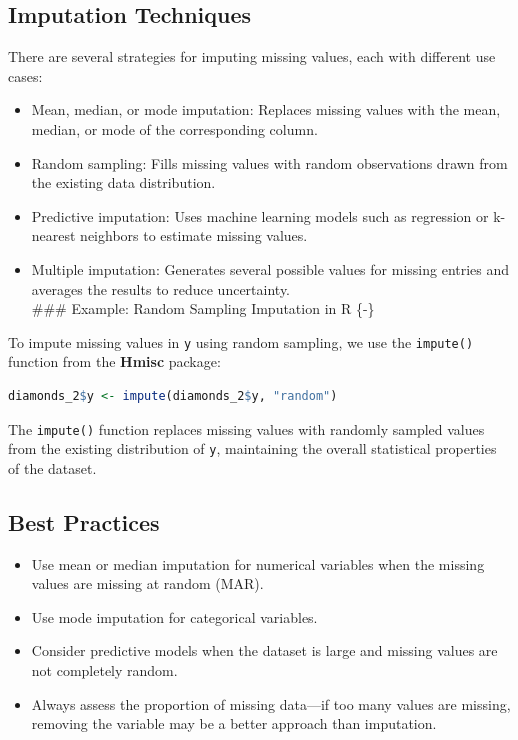 \documentclass[
]{book}
\newcommand{\passthrough}[1]{#1}
\providecommand{\tightlist}{%
  \setlength{\itemsep}{0pt}\setlength{\parskip}{0pt}}
\theoremstyle{definition}
\theoremstyle{definition}
\theoremstyle{definition}
\theoremstyle{definition}
\theoremstyle{remark}
\begin{document}
\subsection*{Imputation Techniques}\label{imputation-techniques}

There are several strategies for imputing missing values, each with different use cases:

\begin{itemize}
\tightlist
\item
  Mean, median, or mode imputation: Replaces missing values with the mean, median, or mode of the corresponding column.\\
\item
  Random sampling: Fills missing values with random observations drawn from the existing data distribution.\\
\item
  Predictive imputation: Uses machine learning models such as regression or k-nearest neighbors to estimate missing values.\\
\item
  Multiple imputation: Generates several possible values for missing entries and averages the results to reduce uncertainty.\\
  \#\#\# Example: Random Sampling Imputation in R \{-\}
\end{itemize}

To impute missing values in \passthrough{\lstinline!y!} using random sampling, we use the \passthrough{\lstinline!impute()!} function from the \textbf{Hmisc} package:

\begin{lstlisting}[language=R]
diamonds_2$y <- impute(diamonds_2$y, "random")
\end{lstlisting}

The \passthrough{\lstinline!impute()!} function replaces missing values with randomly sampled values from the existing distribution of \passthrough{\lstinline!y!}, maintaining the overall statistical properties of the dataset.

\subsection*{Best Practices}\label{best-practices}

\begin{itemize}
\tightlist
\item
  Use mean or median imputation for numerical variables when the missing values are missing at random (MAR).\\
\item
  Use mode imputation for categorical variables.\\
\item
  Consider predictive models when the dataset is large and missing values are not completely random.\\
\item
  Always assess the proportion of missing data---if too many values are missing, removing the variable may be a better approach than imputation.
\end{itemize}
\end{document}
